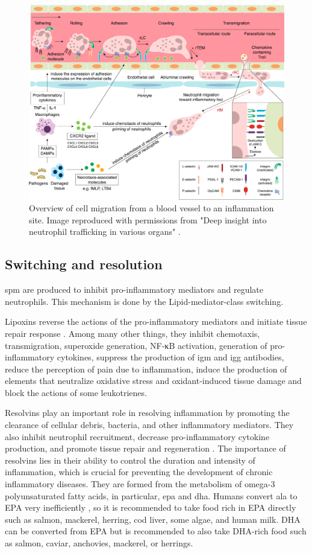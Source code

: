     \begin{figure}[ht!]
        \centering
            \includegraphics[width=0.8\linewidth]{figures/Inflammation/jlb0617-fig-0002-m.jpg} 
        \caption{Overview of cell migration from a blood vessel to an inflammation site. Image reproduced with permissions from "Deep insight into neutrophil trafficking in various organs" \cite{Hyun2017}.}
        \label{figure:inflammationStarts}
    \end{figure}  


\subsection{Switching and resolution}

\gls{spm} are produced to inhibit pro-inflammatory mediators and regulate neutrophils. This mechanism is done by the Lipid-mediator-class switching.

Lipoxins reverse the actions of the pro-inflammatory mediators and initiate tissue repair response \cite{Basil2015}. Among many other things, they inhibit chemotaxis, transmigration, superoxide generation, NF-κB activation, generation of pro-inflammatory cytokines, suppress the production of \gls{igm} and \gls{igg} antibodies, reduce the perception of pain due to inflammation, induce the production of elements that neutralize oxidative stress and oxidant-induced tissue damage and block the actions of some leukotrienes. \cite{Sharmawalia2015}

Resolvins play an important role in resolving inflammation by promoting the clearance of cellular debris, bacteria, and other inflammatory mediators. They also inhibit neutrophil recruitment, decrease pro-inflammatory cytokine production, and promote tissue repair and regeneration \cite{Moro2016}. The importance of resolvins lies in their ability to control the duration and intensity of inflammation, which is crucial for preventing the development of chronic inflammatory diseases. They are formed from the metabolism of omega-3 polyunsaturated fatty acids, in particular, \gls{epa} and \gls{dha}. Humans convert \gls{ala} to EPA very inefficiently \cite{Moro2016}, so it is recommended to take food rich in EPA directly such as salmon, mackerel, herring, cod liver, some algae, and human milk. DHA can be converted from EPA but is recommended to also take DHA-rich food such as salmon, caviar, anchovies, mackerel, or herrings.

